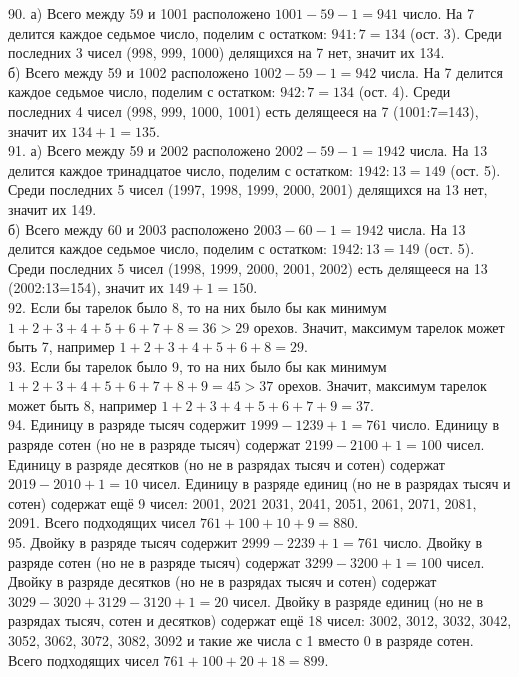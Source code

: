 90. а) Всего между 59 и 1001 расположено $1001-59-1=941$ число. На 7 делится каждое седьмое число, поделим с остатком: $941:7=134$ (ост. 3). Среди последних 3 чисел (998, 999, 1000) делящихся на 7 нет, значит их 134.\\
б) Всего между 59 и 1002 расположено $1002-59-1=942$ числа. На 7 делится каждое седьмое число, поделим с остатком: $942:7=134$ (ост. 4). Среди последних 4 чисел (998, 999, 1000, 1001) есть делящееся на 7 (1001:7=143), значит их $134+1=135.$\\
91. а) Всего между 59 и 2002 расположено $2002-59-1=1942$ числа. На 13 делится каждое тринадцатое число, поделим с остатком: $1942:13=149$ (ост. 5). Среди последних 5 чисел (1997, 1998, 1999, 2000, 2001) делящихся на 13 нет, значит их 149.\\
б) Всего между 60 и 2003 расположено $2003-60-1=1942$ числа. На 13 делится каждое седьмое число, поделим с остатком: $1942:13=149$ (ост. 5). Среди последних 5 чисел (1998, 1999, 2000, 2001, 2002) есть делящееся на 13 (2002:13=154), значит их $149+1=150.$\\
92. Если бы тарелок было 8, то на них было бы как минимум $1+2+3+4+5+6+7+8=36>29$ орехов. Значит, максимум тарелок может быть 7, например $1+2+3+4+5+6+8=29.$\\
93. Если бы тарелок было 9, то на них было бы как минимум $1+2+3+4+5+6+7+8+9=45>37$ орехов. Значит, максимум тарелок может быть 8, например $1+2+3+4+5+6+7+9=37.$\\
94. Единицу в разряде тысяч содержит $1999-1239+1=761$ число. Единицу в разряде сотен (но не в разряде тысяч) содержат $2199-2100+1=100$ чисел. Единицу в разряде десятков (но не в разрядах тысяч и сотен) содержат $2019-2010+1=10$ чисел. Единицу в разряде единиц (но не в разрядах тысяч и сотен) содержат ещё 9 чисел: 2001, 2021 2031, 2041, 2051, 2061, 2071, 2081, 2091. Всего подходящих чисел $761+100+10+9=880.$\\
95. Двойку в разряде тысяч содержит $2999-2239+1=761$ число. Двойку в разряде сотен (но не в разряде тысяч) содержат $3299-3200+1=100$ чисел. Двойку в разряде десятков (но не в разрядах тысяч и сотен) содержат $3029-3020+3129-3120+1=20$ чисел. Двойку в разряде единиц (но не в разрядах тысяч, сотен и десятков) содержат ещё 18 чисел: 3002, 3012, 3032, 3042, 3052, 3062, 3072, 3082, 3092 и такие же числа с 1 вместо 0 в разряде сотен. Всего подходящих чисел $761+100+20+18=899.$\\
